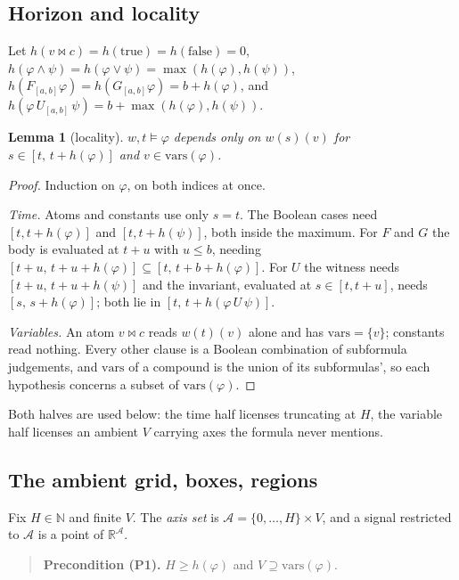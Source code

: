 \documentclass[11pt,a4paper]{article}
\theoremstyle{plain}
\newtheorem{lemma}[theorem]{Lemma}
\theoremstyle{definition}
\theoremstyle{remark}
\newcommand{\R}{\mathbb{R}}
\newcommand{\N}{\mathbb{N}}
\newcommand{\Ax}{\mathcal{A}}
\begin{document}
\subsection{Horizon and locality}

Let $h(v \bowtie c) = h(\mathrm{true}) = h(\mathrm{false}) = 0$,
$h(\varphi \wedge \psi) = h(\varphi \vee \psi) = \max(h(\varphi),h(\psi))$,
$h(F_{[a,b]}\varphi) = h(G_{[a,b]}\varphi) = b + h(\varphi)$, and
$h(\varphi\,U_{[a,b]}\,\psi) = b + \max(h(\varphi),h(\psi))$.

\begin{lemma}[locality]\label{lem:local}
$w,t \models \varphi$ depends only on $w(s)(v)$ for $s \in [t,\, t + h(\varphi)]$
and $v \in \mathrm{vars}(\varphi)$.
\end{lemma}

\begin{proof}
Induction on $\varphi$, on both indices at once.

\emph{Time.} Atoms and constants use only $s = t$. The Boolean cases
need $[t, t{+}h(\varphi)]$ and $[t, t{+}h(\psi)]$, both inside the maximum. For
$F$ and $G$ the body is evaluated at $t{+}u$ with $u \le b$, needing
$[t{+}u,\, t{+}u{+}h(\varphi)] \subseteq [t,\, t{+}b{+}h(\varphi)]$. For $U$ the
witness needs $[t{+}u,\, t{+}u{+}h(\psi)]$ and the invariant, evaluated at
$s \in [t, t{+}u]$, needs $[s,\, s{+}h(\varphi)]$; both lie in
$[t,\, t{+}h(\varphi\,U\,\psi)]$.

\emph{Variables.} An atom $v \bowtie c$ reads $w(t)(v)$ alone and has
$\mathrm{vars} = \{v\}$; constants read nothing. Every other clause is a Boolean
combination of subformula judgements, and $\mathrm{vars}$ of a compound is the
union of its subformulas', so each hypothesis concerns a subset of
$\mathrm{vars}(\varphi)$.
\end{proof}

Both halves are used below: the time half licenses truncating at $H$, the
variable half licenses an ambient $V$ carrying axes the formula never mentions.

\subsection{The ambient grid, boxes, regions}\label{sec:grid}

Fix $H \in \N$ and finite $V$. The \emph{axis set} is $\Ax = \{0,\dots,H\}
\times V$, and a signal restricted to $\Ax$ is a point of $\R^{\Ax}$.

\begin{quote}
\textbf{Precondition (P1).} $H \ge h(\varphi)$ and $V \supseteq
\mathrm{vars}(\varphi)$.
\end{quote}
\end{document}

